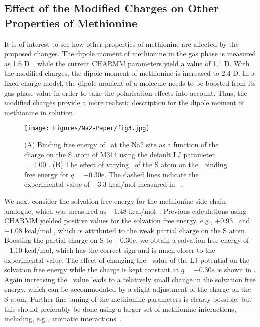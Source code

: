 \subsection{Effect of the Modified Charges on Other Properties of Methionine}
It is of interest to see how other properties of methionine are affected by the proposed changes. 
The dipole moment of methionine in the gas phase is measured as 1.6 D~\cite{Haynes2003}, while the 
current CHARMM parameters yield a value of 1.1 D. With the modified charges, the dipole moment of 
methionine is increased to 2.4 D. In a fixed-charge model, the dipole moment of a molecule needs to 
be boosted from its gas phase value in order to take the polarisation effects into account. Thus, 
the modified charges provide a more realistic description for the dipole moment of methionine in 
solution.

\begin{figure}[t!]
\texttt{[image: Figures/Na2-Paper/fig3.jpg]}
\caption{(A) Binding free energy of \Na\ at the Na2 site as a function of the charge 
         on the S atom of M314 using the default LJ parameter \Rmin{}$=4.00$ \angs. 
         (B) The effect of varying \Rmin\ of the S atom on the \Na\ binding free energy 
         for $q=-0.30e$. The dashed lines indicate the experimental value of $-$3.3 
         kcal/mol measured in \GltPh~\cite{Ryan2009}.}
\label{na2:fig3}
\end{figure}

We next consider the solvation free energy for the methionine side chain analogue, which was measured 
as $-1.48$ kcal/mol~\cite{Wolfenden1981}. Previous calculations using CHARMM yielded positive values 
for the solvation free energy, e.g., $+0.93$~\cite{Deng2004} and $+1.08$ kcal/mol \cite{Shirts2003a}, 
which is attributed to the weak partial charge on the S atom. Boosting the partial charge on S to 
$-0.30e$, we obtain a solvation free energy of $-1.10$ kcal/mol, which has the correct sign and is 
much closer to the experimental value. The effect of changing the \Rmin\ value of the LJ potential 
on the solvation free energy while the charge is kept constant at $q = -0.30e$ is shown in 
. Again increasing the \Rmin\ value leads to a relatively small change in the 
solvation free energy, which can be accommodated by a slight adjustment of the charge on the S atom. 
Further fine-tuning of the methionine parameters is clearly possible, but this should preferably be 
done using a larger set of methionine interactions, including, e.g., aromatic 
interactions~\cite{Valley2012}.

